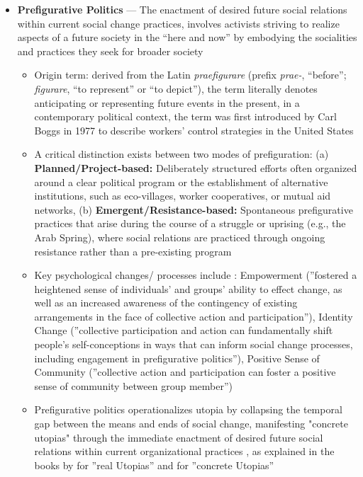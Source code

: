 \documentclass[jou,floatsintext]{apa7}
\begin{document}
\begin{itemize}
\begin{itemize}
    \item \textbf{Prefigurative Politics} --- The enactment of desired future social relations within current social change practices, involves activists striving to realize aspects of a future society in the ``here and now'' by embodying the socialities and practices they seek for broader society \parencite{centemeriFutureNowIntroduction2024, clarkeEmergentPrefigurativePolitics2025}
    \begin{itemize}
        \item Origin term: derived from the Latin \textit{praefigurare} (prefix \textit{prae-}, ``before''; \textit{figurare}, ``to represent'' or ``to depict''), the term literally denotes anticipating or representing future events in the present, in a contemporary political context, the term was first introduced by Carl Boggs in 1977 to describe workers' control strategies in the United States \parencite{monticelliNecessityPrefigurativePolitics2021}
        \item A critical distinction exists between two modes of prefiguration: (a) \textbf{Planned/Project-based:} Deliberately structured efforts often organized around a clear political program or the establishment of alternative institutions, such as eco-villages, worker cooperatives, or mutual aid networks, (b) \textbf{Emergent/Resistance-based:} Spontaneous prefigurative practices that arise during the course of a struggle or uprising (e.g., the Arab Spring), where social relations are practiced through ongoing resistance rather than a pre-existing program \parencite{clarkeEmergentPrefigurativePolitics2025}
        \item Key psychological changes/ processes include \parencite{clarkeEmergentPrefigurativePolitics2025}: Empowerment (''fostered a heightened sense of individuals' and groups' ability to effect change, as well as an increased awareness of the contingency of existing arrangements in the face of collective action and participation''), Identity Change (''collective participation and action can fundamentally shift people's self-conceptions in ways that can inform social change processes, including engagement in prefigurative politics''), Positive Sense of Community (''collective action and participation can foster a positive sense of community between group member'')
        \item[$\rightarrow$] Prefigurative politics operationalizes utopia by collapsing the temporal gap between the means and ends of social change, manifesting "concrete utopias" through the immediate enactment of desired future social relations within current organizational practices \parencite{monticelliNecessityPrefigurativePolitics2021}, as explained in the books by \cite{wrightEnvisioningRealUtopias2010} for ''real Utopias'' and \cite{dinersteinSocialSciencesOther2017} for ''concrete Utopias''
    \end{itemize}


\end{itemize}
\end{itemize}
\end{document}
